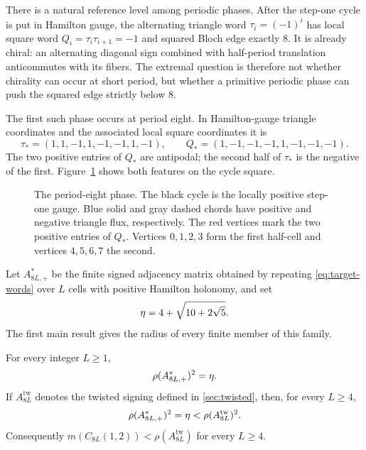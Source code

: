 There is a natural reference level among periodic phases.  After the step-one
cycle is put in Hamilton gauge, the alternating triangle word
$\tau_i=(-1)^i$ has local square word $Q_i=\tau_i\tau_{i+1}=-1$ and squared
Bloch edge exactly $8$.  It is already chiral: an alternating diagonal sign
combined with half-period translation anticommutes with its fibers.  The
extremal question is therefore not whether chirality can occur at short
period, but whether a primitive periodic phase can push the squared edge
strictly below $8$.

The first such phase occurs at period eight.  In Hamilton-gauge triangle
coordinates and the associated local square coordinates it is
\begin{equation}
 \tau_*=(1,1,-1,1,-1,-1,1,-1),\qquad
 Q_*=(1,-1,-1,-1,1,-1,-1,-1).
 \label{eq:target-words}
\end{equation}
The two positive entries of $Q_*$ are antipodal; the second half of $\tau_*$
is the negative of the first.  Figure~\ref{fig:period8-cell} shows both
features on the cycle square.

\begin{figure}[t]
 \centering
 
 \caption{The period-eight phase.  The black cycle is the locally positive
 step-one gauge.  Blue solid and gray dashed chords have positive and negative
 triangle flux, respectively.  The red vertices mark the two positive entries
 of $Q_*$.  Vertices $0,1,2,3$ form the first half-cell and vertices
 $4,5,6,7$ the second.}
 \label{fig:period8-cell}
\end{figure}

Let $A_{8L,+}^{*}$ be the finite signed adjacency matrix obtained by repeating
\eqref{eq:target-words} over $L$ cells with positive Hamilton holonomy, and set
\begin{equation}
 \eta=4+\sqrt{10+2\sqrt5}.
 \label{eq:eta}
\end{equation}
The first main result gives the radius of every finite member of this family.

\begin{theorem}
\label{thm:main-exact}
For every integer $L\geq1$,
\[
 \rho(A_{8L,+}^{*})^2=\eta.
\]
If $A_{8L}^{\mathrm{tw}}$ denotes the twisted signing defined in
\cref{sec:twisted}, then, for every $L\geq4$,
\[
 \rho(A_{8L,+}^{*})^2=\eta
   <\rho(A_{8L}^{\mathrm{tw}})^2.
\]
Consequently $m(C_{8L}(1,2))<\rho(A_{8L}^{\mathrm{tw}})$ for every $L\geq4$.
\end{theorem}

